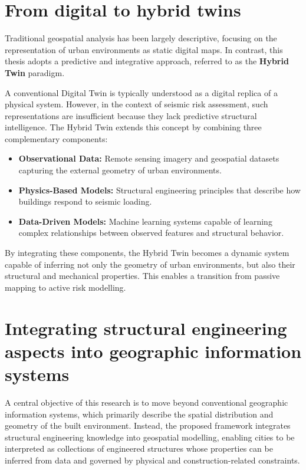 \renewcommand{\sectionnametext}{From digital to hybrid twins}
\renewcommand{\headingtextR}{\thesection. \sectionnametext}
\section{\sectionnametext}


Traditional geospatial analysis has been largely descriptive, focusing on the representation of urban environments as static digital maps. In contrast, this thesis adopts a predictive and integrative approach, referred to as the \textbf{Hybrid Twin} paradigm.

A conventional Digital Twin is typically understood as a digital replica of a physical system. However, in the context of seismic risk assessment, such representations are insufficient because they lack predictive structural intelligence. The Hybrid Twin extends this concept by combining three complementary components:

\begin{itemize}
    \item \textbf{Observational Data:} Remote sensing imagery and geospatial datasets capturing the external geometry of urban environments.
    \item \textbf{Physics-Based Models:} Structural engineering principles that describe how buildings respond to seismic loading.
    \item \textbf{Data-Driven Models:} Machine learning systems capable of learning complex relationships between observed features and structural behavior.
\end{itemize}

By integrating these components, the Hybrid Twin becomes a dynamic system capable of inferring not only the geometry of urban environments, but also their structural and mechanical properties. This enables a transition from passive mapping to active risk modelling.

\renewcommand{\sectionnametext}{Integrating structural engineering aspects into geographic information systems}
\renewcommand{\headingtextR}{\thesection. \sectionnametext}
\section{\sectionnametext}

A central objective of this research is to move beyond conventional geographic information systems, which primarily describe the spatial distribution and geometry of the built environment. Instead, the proposed framework integrates structural engineering knowledge into geospatial modelling, enabling cities to be interpreted as collections of engineered structures whose properties can be inferred from data and governed by physical and construction-related constraints.

